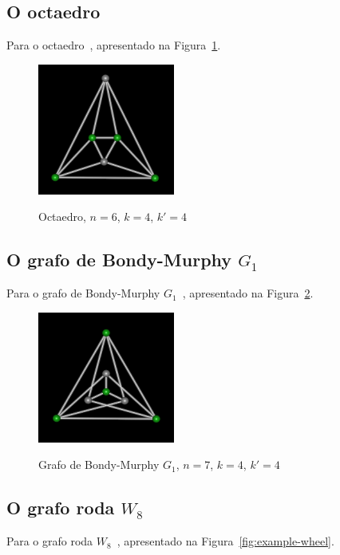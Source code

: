 \subsection{O octaedro}
Para o octaedro~\cite{cite:example-plato},
apresentado na Figura~\ref{fig:example-octaedro}.

\begin{figure}[htb]
\centering
\includegraphics[width=0.4\textwidth]{img/octaedro.png}
\label{fig:example-octaedro}
\caption{Octaedro, $n=6$, $k=4$, $k'=4$}
\end{figure}


\subsection{O grafo de Bondy-Murphy $G_1$}
Para o grafo de Bondy-Murphy $G_1$~\cite{cite:example-bondy},
apresentado na Figura~\ref{fig:example-bondymurphyg1}.

\begin{figure}[htb]
\centering
\includegraphics[width=0.4\textwidth]{img/bondymurphyg1.png}
\label{fig:example-bondymurphyg1}
\caption{Grafo de Bondy-Murphy $G_1$, $n=7$, $k=4$, $k'=4$}
\end{figure}


\subsection{O grafo roda $W_8$}
Para o grafo roda $W_8$~\cite{cite:example-bondy},
apresentado na Figura~\ref{fig:example-wheel}.

